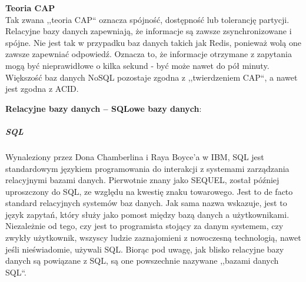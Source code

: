 \documentclass[12pt, a4paper, twoside, openany]{book}
\begin{document}
\textbf{Teoria CAP} \\
Tak zwana ,,teoria CAP`` oznacza spójność, dostępność lub tolerancję partycji. Relacyjne bazy danych zapewniają, że informacje są zawsze zsynchronizowane i spójne. Nie jest tak w przypadku baz danych takich jak Redis, ponieważ wolą one zawsze zapewniać odpowiedź. Oznacza to, że informacje otrzymane z zapytania mogą być nieprawidłowe o kilka sekund - być może nawet do pół minuty. Większość baz danych NoSQL pozostaje zgodna z ,,twierdzeniem CAP``, a nawet jest zgodna z ACID.

\textbf{Relacyjne bazy danych -- SQLowe bazy danych}:\\
\subparagraph*{SQL\\}
Wynaleziony przez Dona Chamberlina i Raya Boyce'a w IBM, SQL jest standardowym językiem programowania do interakcji z systemami zarządzania relacyjnymi bazami danych.
Pierwotnie znany jako SEQUEL, został później uproszczony do SQL, ze względu na kwestię znaku towarowego.
Jest to de facto standard relacyjnych systemów baz danych.
Jak sama nazwa wskazuje, jest to język zapytań, który służy jako pomost między bazą danych a użytkownikami.
Niezależnie od tego, czy jest to programista stojący za danym systemem, czy zwykły użytkownik, wszyscy ludzie zaznajomieni z nowoczesną technologią, nawet jeśli nieświadomie, używali SQL.
Biorąc pod uwagę, jak blisko relacyjne bazy danych są powiązane z SQL, są one powszechnie nazywane ,,bazami danych SQL``.
\end{document}
